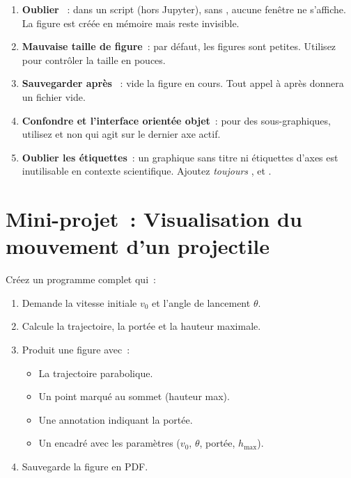 \begin{errmark}
\begin{enumerate}
    \item \textbf{Oublier }~: dans un script (hors Jupyter), sans
    , aucune fen\^etre ne s'affiche. La figure est cr\'e\'ee en m\'emoire
    mais reste invisible.

    \item \textbf{Mauvaise taille de figure}~: par d\'efaut, les figures sont petites.
    Utilisez  pour contr\^oler la taille
    en pouces.

    \item \textbf{Sauvegarder apr\`es }~:  vide la figure
    en cours. Tout appel \`a  apr\`es donnera un fichier vide.

    \item \textbf{Confondre  et l'interface orient\'ee objet}~: pour des
    sous-graphiques, utilisez  et non  qui agit sur
    le dernier axe actif.

    \item \textbf{Oublier les \'etiquettes}~: un graphique sans titre ni \'etiquettes
    d'axes est inutilisable en contexte scientifique. Ajoutez \emph{toujours}
    ,  et .
\end{enumerate}
\end{errmark}

\section{Mini-projet~: Visualisation du mouvement d'un projectile}

\begin{projet}
Cr\'eez un programme complet qui~:
\begin{enumerate}
    \item Demande la vitesse initiale $v_0$ et l'angle de lancement $\theta$.
    \item Calcule la trajectoire, la port\'ee et la hauteur maximale.
    \item Produit une figure avec~:
    \begin{itemize}
        \item La trajectoire parabolique.
        \item Un point marqu\'e au sommet (hauteur max).
        \item Une annotation indiquant la port\'ee.
        \item Un encadr\'e avec les param\`etres ($v_0$, $\theta$, port\'ee, $h_{\max}$).
    \end{itemize}
    \item Sauvegarde la figure en PDF.
\end{enumerate}
\end{projet}

